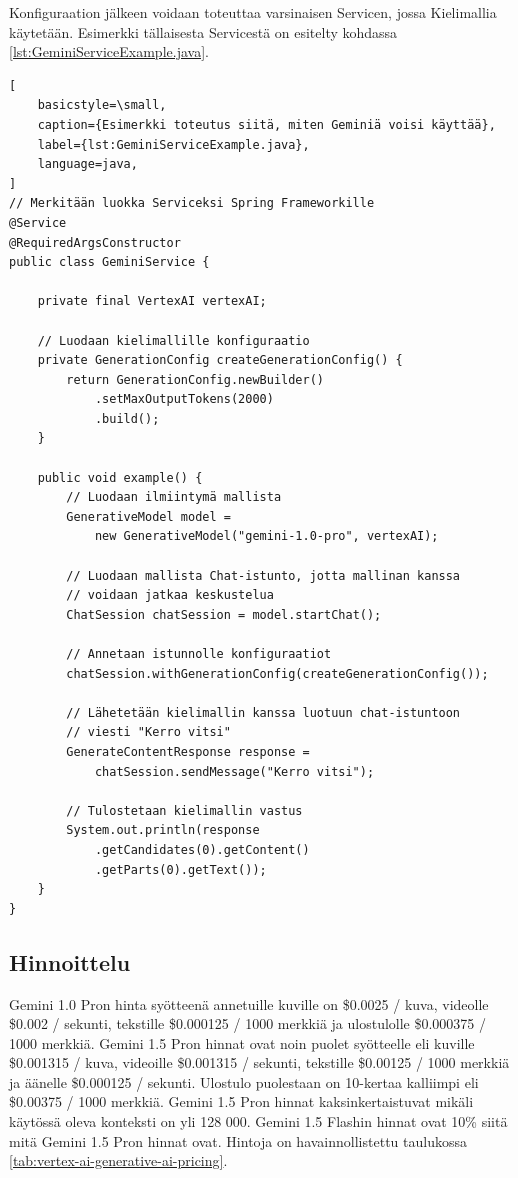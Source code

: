 Konfiguraation jälkeen voidaan toteuttaa varsinaisen Servicen, jossa
Kielimallia käytetään. Esimerkki tällaisesta Servicestä on esitelty
kohdassa \ref{lst:GeminiServiceExample.java}.

\begin{lstlisting}[
    basicstyle=\small,
    caption={Esimerkki toteutus siitä, miten Geminiä voisi käyttää},
    label={lst:GeminiServiceExample.java},
    language=java,
]
// Merkitään luokka Serviceksi Spring Frameworkille
@Service
@RequiredArgsConstructor
public class GeminiService {

    private final VertexAI vertexAI;

    // Luodaan kielimallille konfiguraatio
    private GenerationConfig createGenerationConfig() {
        return GenerationConfig.newBuilder()
            .setMaxOutputTokens(2000)
            .build();
    }

    public void example() {
        // Luodaan ilmiintymä mallista
        GenerativeModel model =
            new GenerativeModel("gemini-1.0-pro", vertexAI);

        // Luodaan mallista Chat-istunto, jotta mallinan kanssa
        // voidaan jatkaa keskustelua
        ChatSession chatSession = model.startChat();

        // Annetaan istunnolle konfiguraatiot
        chatSession.withGenerationConfig(createGenerationConfig());

        // Lähetetään kielimallin kanssa luotuun chat-istuntoon
        // viesti "Kerro vitsi"
        GenerateContentResponse response =
            chatSession.sendMessage("Kerro vitsi");

        // Tulostetaan kielimallin vastus
        System.out.println(response
            .getCandidates(0).getContent()
            .getParts(0).getText());
    }
}
\end{lstlisting}

\subsection{Hinnoittelu}

Gemini 1.0 Pron hinta syötteenä annetuille kuville on \$0.0025 / kuva, videolle
\$0.002 / sekunti, tekstille \$0.000125 / 1000 merkkiä ja ulostulolle
\$0.000375 / 1000 merkkiä. Gemini 1.5 Pron hinnat ovat noin puolet syötteelle
eli kuville \$0.001315 / kuva, videoille \$0.001315 / sekunti, tekstille
\$0.00125 / 1000 merkkiä ja äänelle \$0.000125 / sekunti. Ulostulo puolestaan
on 10-kertaa kalliimpi eli \$0.00375 / 1000 merkkiä. Gemini 1.5 Pron hinnat
kaksinkertaistuvat mikäli käytössä oleva konteksti on yli 128 000. Gemini
1.5 Flashin hinnat ovat 10\% siitä mitä Gemini 1.5 Pron hinnat ovat.
\parencite{vertexAiGenerativeAiPricing} Hintoja on havainnollistettu taulukossa
\ref{tab:vertex-ai-generative-ai-pricing}.


